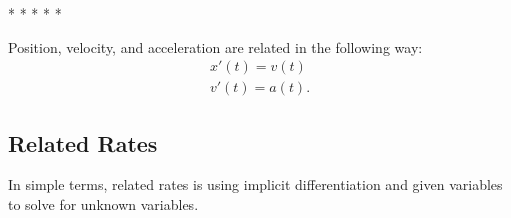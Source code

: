 \documentclass[12pt]{article}
\begin{document}
\begin{center}
	* * * * *
\end{center}

\noindent Position, velocity, and acceleration are related in the following way:
\begin{gather*}
	x'(t) = v(t) \\
	v'(t) = a(t).
\end{gather*}

\subsection{Related Rates}
In simple terms, related rates is using implicit differentiation and given variables to solve for unknown variables. %
\end{document}
